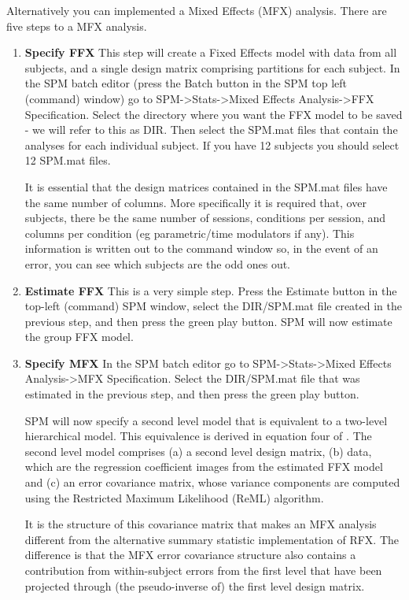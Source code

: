 Alternatively you can implemented a Mixed Effects (MFX) analysis.
There are five steps to a MFX analysis.
\begin{enumerate}
\item \textbf{Specify FFX}
This step will create a Fixed Effects model with data from all subjects, and a single design matrix comprising partitions for each subject.
In the SPM batch editor (press the Batch button in the SPM top left (command) window) go to SPM->Stats->Mixed Effects Analysis->FFX Specification. Select the directory where you want the FFX model to be saved - we will refer to this as DIR.
Then select the SPM.mat files that contain the analyses for each individual subject. If you have 12 subjects you should select 12 SPM.mat files. 

It is essential that the design matrices contained in the SPM.mat files have the same number of columns. More specifically it is required that, over subjects, there be the same number of sessions, conditions per session, and columns per condition (eg parametric/time modulators if any). This information is written out to the command window so, in the event of an error, you can see which subjects are the odd ones out.

\item \textbf{Estimate FFX}
This is a very simple step. Press the Estimate button in the top-left (command) SPM window, select the DIR/SPM.mat file created in the previous step, and then press the green play button. SPM will now estimate the group FFX model.

\item \textbf{Specify MFX} In the SPM batch editor go to SPM->Stats->Mixed Effects Analysis->MFX Specification. Select the DIR/SPM.mat file that was estimated in the previous step, and then press the green play button.

    SPM will now specify a second level model that is equivalent to a two-level hierarchical model. This equivalence is derived in equation four of \cite{karl_mixed}. The second level model comprises (a) a second level design matrix, (b) data, which are the regression coefficient images from the estimated FFX model and (c) an error covariance matrix, whose variance components are computed using the Restricted Maximum Likelihood (ReML) algorithm. 
    
    It is the structure of this covariance matrix that makes an MFX analysis different from the alternative summary statistic implementation of RFX. The difference is that the MFX error covariance structure also contains a contribution from within-subject errors from the first level that have been projected through (the pseudo-inverse of) the first level design matrix.
    

\end{enumerate}
